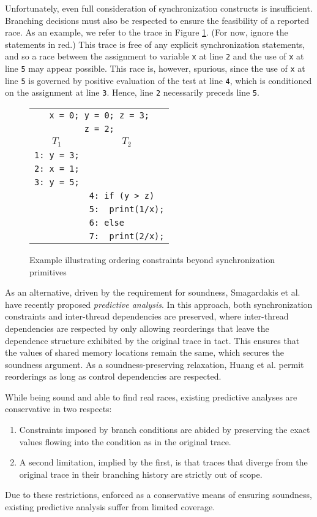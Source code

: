 Unfortunately, even full consideration of synchronization constructs is insufficient. Branching decisions must also be respected to ensure the feasibility of a reported race. As an example, we refer to the trace in Figure \ref{fig:running}. (For now, ignore the statements in red.) This trace is free of any explicit synchronization statements, and so a race between the assignment to variable {\tt x} at line {\tt 2} and the use of {\tt x} at line {\tt 5} may appear possible. This race is, however, spurious, since the use of {\tt x} at line {\tt 5} is governed by positive evaluation of the test at line {\tt 4}, which is conditioned on the assignment at line {\tt 3}. Hence, line {\tt 2} necessarily preceds line {\tt 5}.


\begin{figure}
\centering
\begin{tabular}{ll}
\multicolumn{2}{c}{{\tt x = 0; y = 0; z = 3;}} \\
\multicolumn{2}{c}{{\color{red} {\tt z = 2;}}} \\
\hline
\multicolumn{1}{c}{$T_1$} & \multicolumn{1}{c}{$T_2$} \\
\hline
{\tt 1: y = 3;} & \\
{\tt 2: x = 1;} & \\
{\tt 3: y = 5;} & \\
& {\tt 4: if (y > z)} \\
& {\tt 5:~~print(1/x);} \\	
& {\color{red} {\tt 6: else}} \\
& {\color{red} {\tt 7:~~print(2/x);}}
\end{tabular}
\caption{Example illustrating ordering constraints beyond synchronization primitives}
\label{fig:running}
\end{figure}

As an alternative, driven by the requirement for soundness, 
Smagardakis et al. have recently proposed \emph{predictive analysis}. In this approach, both synchronization constraints and inter-thread dependencies are preserved, where inter-thread dependencies are respected by 
only allowing reorderings that leave the dependence structure exhibited by the original trace in tact. This ensures that the values of shared memory locations remain the same, which secures the soundness argument. As a soundness-preserving relaxation, Huang et al. \cite{XXX} permit reorderings as long as control dependencies are respected.

While being sound and able to find real races, existing predictive analyses are conservative in two respects:
\begin{enumerate}
	\item Constraints imposed by branch conditions are abided by preserving the exact values flowing into the condition as in the original trace.
	\item A second limitation, implied by the first, is that traces that diverge from the original trace in their branching history are strictly out of scope. 
\end{enumerate}
 Due to these restrictions, enforced as a conservative means of ensuring soundness, existing predictive analysis suffer from limited coverage.
 
